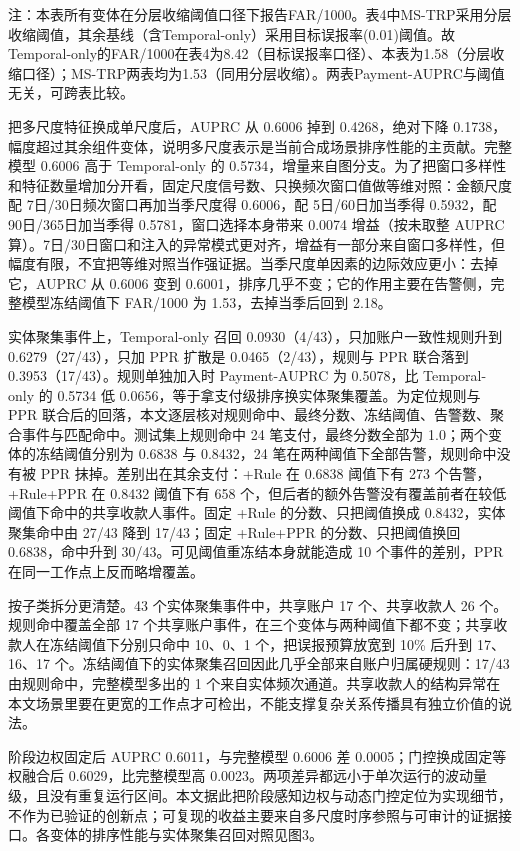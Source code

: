 \documentclass[twocolumn,11pt]{ctexart}
\begin{document}
注：本表所有变体在分层收缩阈值口径下报告FAR/1000。表4中MS-TRP采用分层收缩阈值，其余基线（含Temporal-only）采用目标误报率(0.01)阈值。故Temporal-only的FAR/1000在表4为8.42（目标误报率口径）、本表为1.58（分层收缩口径）；MS-TRP两表均为1.53（同用分层收缩）。两表Payment-AUPRC与阈值无关，可跨表比较。

把多尺度特征换成单尺度后，AUPRC 从 0.6006 掉到 0.4268，绝对下降 0.1738，幅度超过其余组件变体，说明多尺度表示是当前合成场景排序性能的主贡献。完整模型 0.6006 高于 Temporal-only 的 0.5734，增量来自图分支。为了把窗口多样性和特征数量增加分开看，固定尺度信号数、只换频次窗口值做等维对照：金额尺度配 7日/30日频次窗口再加当季尺度得 0.6006，配 5日/60日加当季得 0.5932，配 90日/365日加当季得 0.5781，窗口选择本身带来 0.0074 增益（按未取整 AUPRC 算）。7日/30日窗口和注入的异常模式更对齐，增益有一部分来自窗口多样性，但幅度有限，不宜把等维对照当作强证据。当季尺度单因素的边际效应更小：去掉它，AUPRC 从 0.6006 变到 0.6001，排序几乎不变；它的作用主要在告警侧，完整模型冻结阈值下 FAR/1000 为 1.53，去掉当季后回到 2.18。

实体聚集事件上，Temporal-only 召回 0.0930（4/43），只加账户一致性规则升到 0.6279（27/43），只加 PPR 扩散是 0.0465（2/43），规则与 PPR 联合落到 0.3953（17/43）。规则单独加入时 Payment-AUPRC 为 0.5078，比 Temporal-only 的 0.5734 低 0.0656，等于拿支付级排序换实体聚集覆盖。为定位规则与 PPR 联合后的回落，本文逐层核对规则命中、最终分数、冻结阈值、告警数、聚合事件与匹配命中。测试集上规则命中 24 笔支付，最终分数全部为 1.0；两个变体的冻结阈值分别为 0.6838 与 0.8432，24 笔在两种阈值下全部告警，规则命中没有被 PPR 抹掉。差别出在其余支付：+Rule 在 0.6838 阈值下有 273 个告警，+Rule+PPR 在 0.8432 阈值下有 658 个，但后者的额外告警没有覆盖前者在较低阈值下命中的共享收款人事件。固定 +Rule 的分数、只把阈值换成 0.8432，实体聚集命中由 27/43 降到 17/43；固定 +Rule+PPR 的分数、只把阈值换回 0.6838，命中升到 30/43。可见阈值重冻结本身就能造成 10 个事件的差别，PPR 在同一工作点上反而略增覆盖。

按子类拆分更清楚。43 个实体聚集事件中，共享账户 17 个、共享收款人 26 个。规则命中覆盖全部 17 个共享账户事件，在三个变体与两种阈值下都不变；共享收款人在冻结阈值下分别只命中 10、0、1 个，把误报预算放宽到 10\% 后升到 17、16、17 个。冻结阈值下的实体聚集召回因此几乎全部来自账户归属硬规则：17/43 由规则命中，完整模型多出的 1 个来自实体频次通道。共享收款人的结构异常在本文场景里要在更宽的工作点才可检出，不能支撑复杂关系传播具有独立价值的说法。

阶段边权固定后 AUPRC 0.6011，与完整模型 0.6006 差 0.0005；门控换成固定等权融合后 0.6029，比完整模型高 0.0023。两项差异都远小于单次运行的波动量级，且没有重复运行区间。本文据此把阶段感知边权与动态门控定位为实现细节，不作为已验证的创新点；可复现的收益主要来自多尺度时序参照与可审计的证据接口。各变体的排序性能与实体聚集召回对照见图3。
\end{document}
